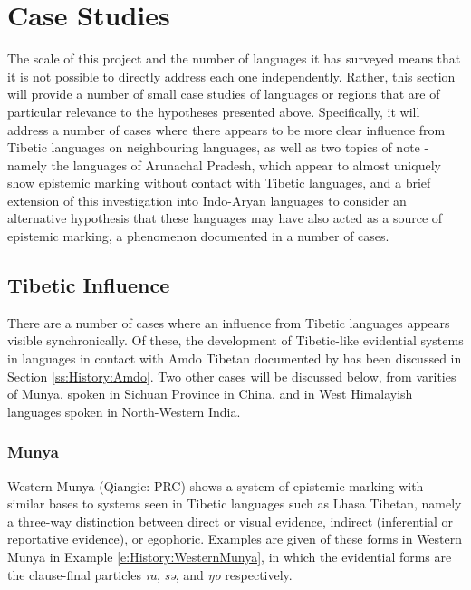 \section{Case Studies}\label{s:History:CaseStudies}
The scale of this project and the number of languages it has surveyed means that it is not possible to directly address each one independently. Rather, this section will provide a number of small case studies of languages or regions that are of particular relevance to the hypotheses presented above. Specifically, it will address a number of cases where there appears to be more clear influence from Tibetic languages on neighbouring languages, as well as two topics of note - namely the languages of Arunachal Pradesh, which appear to almost uniquely show epistemic marking without contact with Tibetic languages, and a brief extension of this investigation into Indo-Aryan languages to consider an alternative hypothesis that these languages may have also acted as a source of epistemic marking, a phenomenon documented in a number of cases.
\subsection{Tibetic Influence}\label{ss:History:TibeticInfluence}
There are a number of cases where an influence from Tibetic languages appears visible synchronically. Of these, the development of Tibetic-like evidential systems in languages in contact with Amdo Tibetan documented by  has been discussed in Section \ref{ss:History:Amdo}. Two other cases will be discussed below, from varities of Munya, spoken in Sichuan Province in China, and in West Himalayish languages spoken in North-Western India.
\subsubsection{Munya}\label{sss:History:Munya}
Western Munya (Qiangic: PRC) shows a system of epistemic marking with similar bases to systems seen in Tibetic languages such as Lhasa Tibetan, namely a three-way distinction between direct or visual evidence, indirect (inferential or reportative evidence), or egophoric. Examples are given of these forms in Western Munya in Example \ref{e:History:WesternMunya}, in which the evidential forms are the clause-final particles \textit{ra}, \textit{sə}, and \textit{ŋo} respectively.

